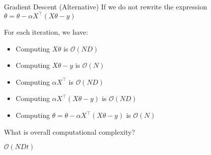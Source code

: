\documentclass[usenames,dvipsnames]{beamer}
\begin{document}
\begin{frame}{Gradient Descent (Alternative)}
\pause If we do not rewrite the expression
\(\theta=\theta - \alpha X^{\top}(X \theta-y)\) 

For each iteration, we have:
\begin{itemize}[<+->]
	\item Computing $X\theta$ is $\mathcal{O}(ND)$
	\item Computing $X\theta - y$ is $\mathcal{O}(N)$
	\item Computing $\alpha X^{\top}$ is $\mathcal{O}(ND)$
	\item Computing $\alpha X^{\top}(X\theta - y)$ is $\mathcal{O}(ND)$
	\item Computing \(\theta=\theta - \alpha X^{\top}(X \theta-y)\) is $\mathcal{O}(N)$
\end{itemize}

\pause What is overall computational complexity?

\pause $\mathcal{O}(NDt)$
\end{frame}

 
\end{document}
